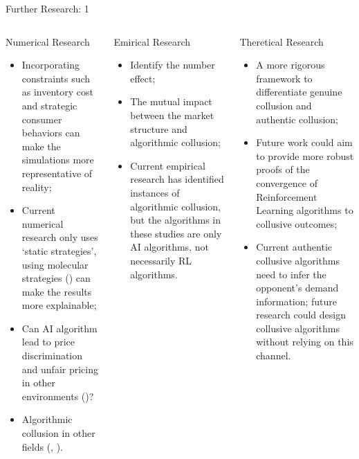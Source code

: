 \documentclass[8pt]{beamer}
\begin{document}
\begin{frame}{Further Research: 1}
    \tiny{
    \begin{columns}[T]
        \begin{block}{Numerical Research}
            \begin{itemize}
                \item Incorporating constraints such as inventory cost and strategic consumer behaviors can make the simulations more representative of reality;
                \item Current numerical research only uses `static strategies', using molecular strategies (\cite{kimbrough2005learning}) can make the results more explainable;
                \item Can AI algorithm lead to price discrimination and unfair pricing in other environments (\cite{spann2024algorithmic})?
                \item Algorithmic collusion in other fields (\cite{contDynamicsMarketMaking2024}, \cite{gu2023can}).
            \end{itemize}
        \end{block}
        \begin{block}{Emirical Research}
            \begin{itemize}
                \item Identify the number effect;
                \item The mutual impact between the market structure and algorithmic collusion;
                \item Current empirical research has identified instances of algorithmic collusion, but the algorithms in these studies are only AI algorithms, not necessarily RL algorithms.
            \end{itemize}
        \end{block}
        \begin{block}{Theretical Research}
            \begin{itemize}
                \item A more rigorous framework to differentiate genuine collusion and authentic collusion;
                \item Future work could aim to provide more robust proofs of the convergence of Reinforcement Learning algorithms to collusive outcomes;
                \item Current authentic collusive algorithms need to infer the opponent's demand information; future research could design collusive algorithms without relying on this channel.
            \end{itemize}
        \end{block}
    \end{columns}
    }
\end{frame}
\end{document}

